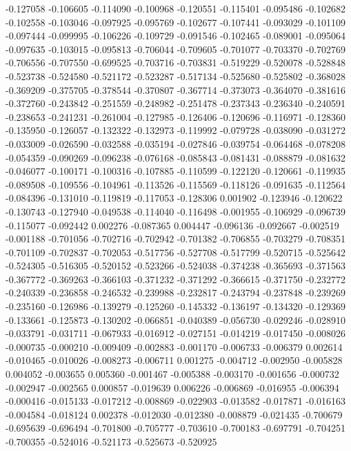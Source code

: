 -0.127058
-0.106605
-0.114090
-0.100968
-0.120551
-0.115401
-0.095486
-0.102682
-0.102558
-0.103046
-0.097925
-0.095769
-0.102677
-0.107441
-0.093029
-0.101109
-0.097444
-0.099995
-0.106226
-0.109729
-0.091546
-0.102465
-0.089001
-0.095064
-0.097635
-0.103015
-0.095813
-0.706044
-0.709605
-0.701077
-0.703370
-0.702769
-0.706556
-0.707550
-0.699525
-0.703716
-0.703831
-0.519229
-0.520078
-0.528848
-0.523738
-0.524580
-0.521172
-0.523287
-0.517134
-0.525680
-0.525802
-0.368028
-0.369209
-0.375705
-0.378544
-0.370807
-0.367714
-0.373073
-0.364070
-0.381616
-0.372760
-0.243842
-0.251559
-0.248982
-0.251478
-0.237343
-0.236340
-0.240591
-0.238653
-0.241231
-0.261004
-0.127985
-0.126406
-0.120696
-0.116971
-0.128360
-0.135950
-0.126057
-0.132322
-0.132973
-0.119992
-0.079728
-0.038090
-0.031272
-0.033009
-0.026590
-0.032588
-0.035194
-0.027846
-0.039754
-0.064468
-0.078208
-0.054359
-0.090269
-0.096238
-0.076168
-0.085843
-0.081431
-0.088879
-0.081632
-0.046077
-0.100171
-0.100316
-0.107885
-0.110599
-0.122120
-0.120661
-0.119935
-0.089508
-0.109556
-0.104961
-0.113526
-0.115569
-0.118126
-0.091635
-0.112564
-0.084396
-0.131010
-0.119819
-0.117053
-0.128306
0.001902
-0.123946
-0.120622
-0.130743
-0.127940
-0.049538
-0.114040
-0.116498
-0.001955
-0.106929
-0.096739
-0.115077
-0.092442
0.002276
-0.087365
0.004447
-0.096136
-0.092667
-0.002519
-0.001188
-0.701056
-0.702716
-0.702942
-0.701382
-0.706855
-0.703279
-0.708351
-0.701109
-0.702837
-0.702053
-0.517756
-0.527708
-0.517799
-0.520715
-0.525642
-0.524305
-0.516305
-0.520152
-0.523266
-0.524038
-0.374238
-0.365693
-0.371563
-0.367772
-0.369263
-0.366103
-0.371232
-0.371292
-0.366615
-0.371750
-0.232772
-0.240339
-0.236858
-0.246532
-0.239988
-0.232817
-0.243794
-0.237848
-0.239269
-0.235160
-0.126986
-0.139279
-0.125260
-0.145332
-0.136197
-0.134320
-0.129369
-0.133661
-0.125873
-0.130202
-0.066851
-0.040389
-0.056730
-0.029246
-0.028910
-0.033791
-0.031711
-0.067933
-0.016912
-0.027151
-0.014219
-0.017450
-0.008026
-0.000735
-0.000210
-0.009409
-0.002883
-0.001170
-0.006733
-0.006379
0.002614
-0.010465
-0.010026
-0.008273
-0.006711
0.001275
-0.004712
-0.002950
-0.005828
0.004052
-0.003655
0.005360
-0.001467
-0.005388
-0.003170
-0.001656
-0.000732
-0.002947
-0.002565
0.000857
-0.019639
0.006226
-0.006869
-0.016955
-0.006394
-0.000416
-0.015133
-0.017212
-0.008869
-0.022903
-0.013582
-0.017871
-0.016163
-0.004584
-0.018124
0.002378
-0.012030
-0.012380
-0.008879
-0.021435
-0.700679
-0.695639
-0.696494
-0.701800
-0.705777
-0.703610
-0.700183
-0.697791
-0.704251
-0.700355
-0.524016
-0.521173
-0.525673
-0.520925

